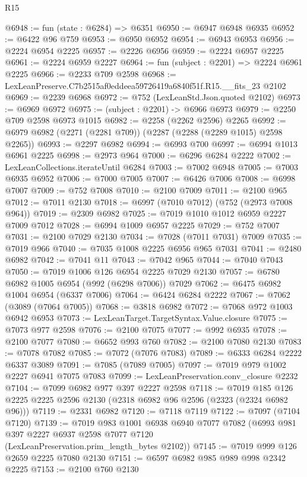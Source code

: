 \begin{lexlean}{R15}
\begin{coremodule}
@6948 := fun (state : @6284) => @6351
@6950 := @6947 @6948 @6935
@6952 := @6422 @96 @759
@6953 := @6950 @6952
@6954 := @6943 @6953
@6956 := @2224 @6954 @2225
@6957 := @2226 @6956
@6959 := @2224 @6957 @2225
@6961 := @2224 @6959 @2227
@6964 := fun (subject : @2201) => @2224 @6961 @2225
@6966 := @2233 @709 @2598
@6968 := LexLeanPreserve.C7b2515af0eddeea59726419a6840f51f.R15.__fits_23 @2102
@6969 := @2239 @6968
@6972 := @752 (LexLeanStd.Json.quoted @2102)
@6973 := @6969 @6972
@6975 := (subject : @2201) -> @6966 @6973
@6979 := @2250 @709 @2598 @6973 @1015
@6982 := @2258 (@2262 @2596) @2265
@6992 := @6979 @6982 (@2271 (@2281 @709)) (@2287 (@2288 (@2289 @1015) @2598 @2265))
@6993 := @2297 @6982
@6994 := @6993 @700
@6997 := @6994 @1013 @6961 @2225
@6998 := @2973 @964
@7000 := @6296 @6284 @2222
@7002 := LexLeanCollections.iterateUntil @6284
@7003 := @7002 @6948
@7005 := @7003 @6935 @6952
@7006 := @7000 @7005
@7007 := @6426 @7006
@7008 := @6998 @7007
@7009 := @752 @7008
@7010 := @2100 @7009
@7011 := @2100 @965
@7012 := @7011 @2130
@7018 := @6997 (@7010 @7012) (@752 (@2973 @7008 @964))
@7019 := @2309 @6982
@7025 := @7019 @1010 @1012 @6959 @2227 @7009 @7012
@7028 := @6994 @1009 @6957 @2225
@7029 := @752 @7007
@7031 := @2100 @7029 @2130
@7034 := @7028 (@7011 @7031) @7009
@7035 := @7019 @966
@7040 := @7035 @1008 @2225 @6956 @965 @7031
@7041 := @2480 @6982
@7042 := @7041 @11
@7043 := @7042 @965
@7044 := @7040 @7043
@7050 := @7019 @1006 @126 @6954 @2225 @7029 @2130
@7057 := @6780 @6982 @1005 @6954 (@992 (@6298 @7006)) @7029
@7062 := @6475 @6982 @1004 @6954 (@6337 @7006)
@7064 := @6424 @6284 @2222
@7067 := @7062 (@3089 (@7064 @7005))
@7068 := @3818 @6982
@7072 := @7068 @972 @1003 @6942 @6953
@7073 := LexLeanTarget.TargetSyntax.Value.closure
@7075 := @7073 @977 @2598
@7076 := @2100 @7075
@7077 := @992 @6935
@7078 := @2100 @7077
@7080 := @6652 @993 @760
@7082 := @2100 @7080 @2130
@7083 := @7078 @7082
@7085 := @7072 (@7076 @7083)
@7089 := @6333 @6284 @2222 @6337 @3089
@7091 := @7085 (@7089 @7005)
@7097 := @7019 @979 @1002 @2227 @6941 @7075 @7083
@7099 := LexLeanPreservation.conv_closure @2232
@7104 := @7099 @6982 @977 @397 @2227 @2598
@7118 := @7019 @185 @126 @2225 @2225 @2596 @2130 (@2318 @6982 @96 @2596 (@2323 (@2324 @6982 @96)))
@7119 := @2331 @6982
@7120 := @7118 @7119
@7122 := @7097 (@7104 @7120)
@7139 := @7019
    @983
    @1001
    @6938
    @6940
    @7077
    @7082
    (@6993 @981 @397 @2227 @6937 @2598 @7077 @7120 (LexLeanPreservation.prim_length_bytes @2102))
@7145 := @7019 @999 @126 @2659 @2225 @7080 @2130
@7151 := @6597 @6982 @985 @989 @998 @2342 @2225
@7153 := @2100 @760 @2130

\end{coremodule}
\end{lexlean}
